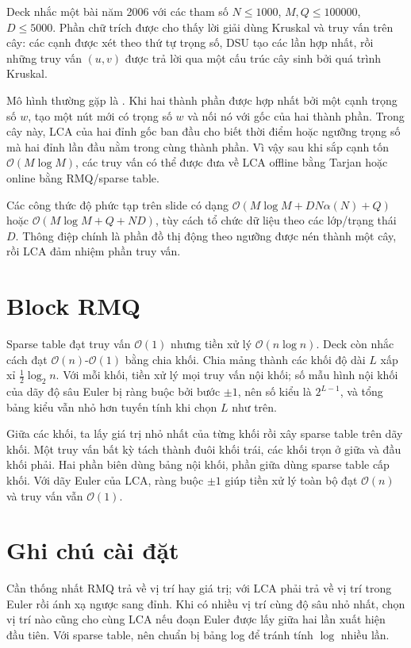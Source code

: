 \documentclass[11pt]{article}
\newcommand{\Oh}{\mathcal{O}}
\begin{document}
Deck nhắc một bài năm 2006 với các tham số \(N\le 1000\),
\(M,Q\le 100000\), \(D\le 5000\). Phần chữ trích được cho thấy lời giải dùng
Kruskal và truy vấn trên cây: các cạnh được xét theo thứ tự trọng số, DSU tạo
các lần hợp nhất, rồi những truy vấn \((u,v)\) được trả lời qua một cấu trúc
cây sinh bởi quá trình Kruskal.

Mô hình thường gặp là . Khi hai thành phần được hợp nhất
bởi một cạnh trọng số \(w\), tạo một nút mới có trọng số \(w\) và nối nó với
gốc của hai thành phần. Trong cây này, LCA của hai đỉnh gốc ban đầu cho biết
thời điểm hoặc ngưỡng trọng số mà hai đỉnh lần đầu nằm trong cùng thành phần.
Vì vậy sau khi sắp cạnh tốn \(\Oh(M\log M)\), các truy vấn có thể được đưa về
LCA offline bằng Tarjan hoặc online bằng RMQ/sparse table.

Các công thức độ phức tạp trên slide có dạng
\(\Oh(M\log M + D N\alpha(N)+Q)\) hoặc \(\Oh(M\log M + Q + ND)\), tùy cách
tổ chức dữ liệu theo các lớp/trạng thái \(D\). Thông điệp chính là phần đồ
thị động theo ngưỡng được nén thành một cây, rồi LCA đảm nhiệm phần truy vấn.

\section{Block RMQ}

Sparse table đạt truy vấn \(\Oh(1)\) nhưng tiền xử lý \(\Oh(n\log n)\). Deck
còn nhắc cách đạt \(\Oh(n)\)-\(\Oh(1)\) bằng chia khối. Chia mảng thành các
khối độ dài \(L\) xấp xỉ \(\frac12\log_2 n\). Với mỗi khối, tiền xử lý mọi
truy vấn nội khối; số mẫu hình nội khối của dãy độ sâu Euler bị ràng buộc
bởi bước \(\pm1\), nên số kiểu là \(2^{L-1}\), và tổng bảng kiểu vẫn nhỏ hơn
tuyến tính khi chọn \(L\) như trên.

Giữa các khối, ta lấy giá trị nhỏ nhất của từng khối rồi xây sparse table
trên dãy khối. Một truy vấn bất kỳ tách thành đuôi khối trái, các khối trọn
ở giữa và đầu khối phải. Hai phần biên dùng bảng nội khối, phần giữa dùng
sparse table cấp khối. Với dãy Euler của LCA, ràng buộc \(\pm1\) giúp tiền xử
lý toàn bộ đạt \(\Oh(n)\) và truy vấn vẫn \(\Oh(1)\).

\section{Ghi chú cài đặt}

Cần thống nhất RMQ trả về vị trí hay giá trị; với LCA phải trả về vị trí trong
Euler rồi ánh xạ ngược sang đỉnh. Khi có nhiều vị trí cùng độ sâu nhỏ nhất,
chọn vị trí nào cũng cho cùng LCA nếu đoạn Euler được lấy giữa hai lần xuất
hiện đầu tiên. Với sparse table, nên chuẩn bị bảng log để tránh tính
\(\log\) nhiều lần.
\end{document}
